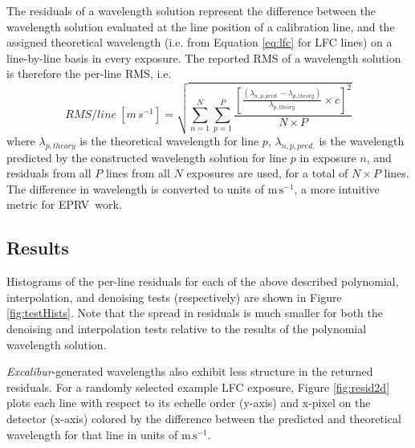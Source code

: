 \documentclass[twocolumn,table,xcolor,trackchanges]{aastex63}
\newcommand{\project}[1]{\textsl{#1}}
\newcommand{\Name}{\project{Excalibur}}
\newcommand{\acronym}[1]{{\small{#1}}}
\newcommand{\eprv}{\acronym{EPRV}}
\newcommand{\mps}{\mathrm{m\,s^{-1}}}
\begin{document}
The residuals of a wavelength solution represent the difference between the wavelength solution evaluated at the line position of a calibration line, and the assigned theoretical wavelength (i.e. from Equation \ref{eq:lfc} for LFC lines) on a line-by-line basis in every exposure.  The reported RMS of a wavelength solution is therefore the per-line RMS, i.e.
\begin{equation}
RMS/line \: [m\,s^{-1}] = \sqrt{\sum_{n=1}^N\sum_{p=1}^P\frac{[ \frac{(\lambda_{n,p,pred.} - \lambda_{p,theory})}{\lambda_{p,theory}} \times c ]^2}{N \times P}}
\label{eq:rms}
\end{equation}
where $\lambda_{p,theory}$ is the theoretical wavelength for line $p$, $\lambda_{n,p,pred.}$ is the wavelength predicted by the constructed wavelength solution for line $p$ in exposure $n$, and residuals from all $P$ lines from all $N$ exposures are used, for a total of $N \times P$ lines.  The difference in wavelength is converted to units of $\mps$, a more intuitive metric for \eprv\ work.

\subsection{Results}
Histograms of the per-line residuals for each of the above described polynomial, interpolation, and denoising tests (respectively) are shown in Figure \ref{fig:testHists}.  Note that the spread in residuals is much smaller for both the denoising and interpolation tests relative to the results of the polynomial wavelength solution.


\Name -generated wavelengths also exhibit less structure in the returned residuals.  For a randomly selected example LFC exposure, Figure \ref{fig:resid2d} plots each line with respect to its echelle order (y-axis) and x-pixel on the detector (x-axis) colored by the difference between the predicted and theoretical wavelength for that line in units of $\mps$.
\end{document}
